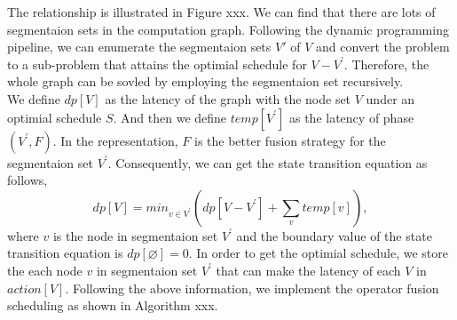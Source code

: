 The relationship is illustrated in Figure xxx. We can find that there are lots of segmentaion sets in the computation graph. Following the dynamic programming
pipeline, we can enumerate the segmentaion sets $V{'}$ of $V$ and convert the problem to a sub-problem that attains the optimial schedule for $V-V^{'}$. Therefore,
the whole graph can be sovled by employing the segmentaion set recursively. \\
We define $dp[V]$ as the latency of the graph with the node set $V$ under an optimial schedule $S$. And then we define $temp[V^{'}]$ as the latency of 
phase $(V^{'}, F)$. In the representation, $F$ is the better fusion strategy for the segmentaion set $V^{'}$. Consequently, we can get the state transition 
equation as follows,
\begin{equation}
    dp[V] = min_{ v \in V^{'}}(dp[V-V^{'}] + \sum_{v}temp[v]),    
\end{equation}
where $v$ is the node in segmentaion set $V^{'}$ and the boundary value of the state transition equation is $dp[\varnothing] = 0$. In order to get the optimial
schedule, we store the each node $v$ in segmentaion set $V^{'}$ that can make the latency of each $V$ in $action[V]$.
Following the above information, we implement the operator fusion scheduling as shown in Algorithm xxx.




